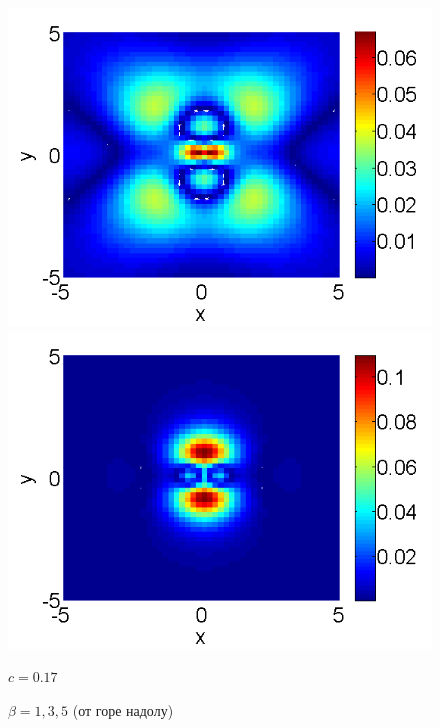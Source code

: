 \documentclass[a4paper]{article}
\theoremstyle{remark}
\begin{document}
\begin{large}
\begin{figure}[htbp]
\begin{minipage}[b]{0.48\linewidth}
		 \includegraphics[width=\linewidth]{BestFitVsSimpleIter/ChristovIC_50_bt1_c050_h02_O(h^6).png}
	\end{minipage}
	\begin{minipage}[b]{0.48\linewidth}
		\raggedleft
		 \includegraphics[width=\linewidth]{BestFitVsSimpleIter/ChristovIC_50_bt5_c017_h02_O(h^6).png}
		\centerline{$c=0.17$}
		\centerline{$\beta = 1,3,5$ (от горе надолу) }
	\end{minipage}
	\begin{minipage}[b]{0.48\linewidth}
		\raggedright

\end{minipage}
\end{figure}
\end{large}
\end{document}
